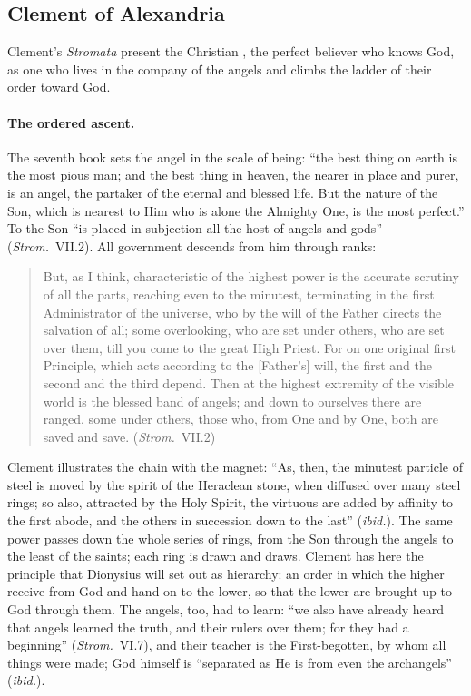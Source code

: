 \sectionguard
\subsection{Clement of Alexandria}

Clement's \emph{Stromata} present the Christian , the
perfect believer who knows God, as one who lives in the company of the
angels and climbs the ladder of their order toward God.

\paragraph{The ordered ascent.} The seventh book sets the angel in the scale of being: ``the best thing on earth is the most pious
man; and the best thing in heaven, the nearer in place and purer, is an
angel, the partaker of the eternal and blessed life. But the nature of the
Son, which is nearest to Him who is alone the Almighty One, is the most
perfect.'' To the Son ``is placed in subjection all the host of angels and
gods'' (\emph{Strom.}\ VII.2). All government descends from him through
ranks:

\begin{quote}
But, as I think, characteristic of the highest power is the accurate
scrutiny of all the parts, reaching even to the minutest, terminating in
the first Administrator of the universe, who by the will of the Father
directs the salvation of all; some overlooking, who are set under others,
who are set over them, till you come to the great High Priest. For on one
original first Principle, which acts according to the [Father's] will, the
first and the second and the third depend. Then at the highest extremity
of the visible world is the blessed band of angels; and down to ourselves
there are ranged, some under others, those who, from One and by One, both
are saved and save. (\emph{Strom.}\ VII.2)
\end{quote}

\noindent Clement illustrates the chain with the magnet: ``As, then, the
minutest particle of steel is moved by the spirit of the Heraclean stone,
when diffused over many steel rings; so also, attracted by the Holy
Spirit, the virtuous are added by affinity to the first abode, and the
others in succession down to the last'' (\emph{ibid.}). The same power
passes down the whole series of rings, from the Son through the angels to
the least of the saints; each ring is drawn and draws. Clement has here the
principle that Dionysius will set out as hierarchy: an order in which the
higher receive from God and hand on to the lower, so that the lower are
brought up to God through them. The angels, too, had to learn: ``we also
have already heard that angels learned the truth, and their rulers over
them; for they had a beginning'' (\emph{Strom.}\ VI.7), and their teacher
is the First-begotten, by whom all things were made; God himself is
``separated as He is from even the archangels'' (\emph{ibid.}).

